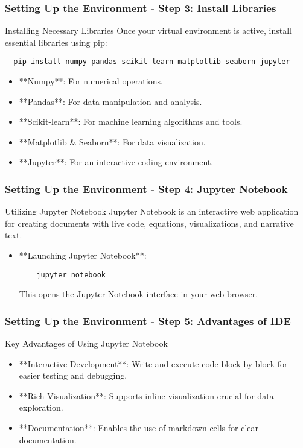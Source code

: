 \documentclass[aspectratio=169]{beamer}
\begin{document}
\begin{frame}[fragile]
  \frametitle{Setting Up the Environment - Step 3: Install Libraries}
  \begin{block}{Installing Necessary Libraries}
  Once your virtual environment is active, install essential libraries using pip:
  \end{block}
  
  \begin{lstlisting}
  pip install numpy pandas scikit-learn matplotlib seaborn jupyter
  \end{lstlisting}
  
  \begin{itemize}
    \item **Numpy**: For numerical operations.
    \item **Pandas**: For data manipulation and analysis.
    \item **Scikit-learn**: For machine learning algorithms and tools.
    \item **Matplotlib \& Seaborn**: For data visualization.
    \item **Jupyter**: For an interactive coding environment.
  \end{itemize}
\end{frame}

\begin{frame}[fragile]
  \frametitle{Setting Up the Environment - Step 4: Jupyter Notebook}
  \begin{block}{Utilizing Jupyter Notebook}
  Jupyter Notebook is an interactive web application for creating documents with live code, equations, visualizations, and narrative text.
  \end{block}
  
  \begin{itemize}
    \item **Launching Jupyter Notebook**:
    \begin{lstlisting}
    jupyter notebook
    \end{lstlisting}
    This opens the Jupyter Notebook interface in your web browser.
  \end{itemize}
\end{frame}

\begin{frame}[fragile]
  \frametitle{Setting Up the Environment - Step 5: Advantages of IDE}
  \begin{block}{Key Advantages of Using Jupyter Notebook}
    \begin{itemize}
      \item **Interactive Development**: Write and execute code block by block for easier testing and debugging.
      \item **Rich Visualization**: Supports inline visualization crucial for data exploration.
      \item **Documentation**: Enables the use of markdown cells for clear documentation.
    \end{itemize}
  \end{block}
\end{frame}
\end{document}
